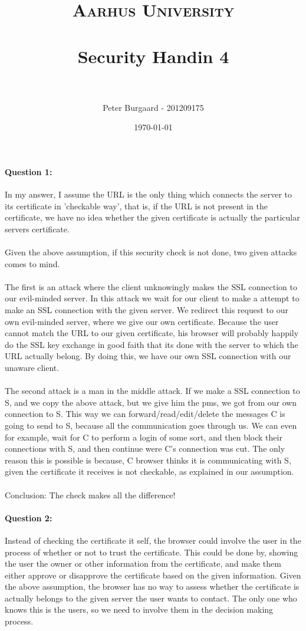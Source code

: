 \documentclass[paper=a4, fontsize=11pt]{scrartcl} %
\title{	
	\normalfont \normalsize 
	\textsc{Aarhus University} \\ [25pt] %
	\horrule{0.5pt} \\[0.4cm] %
	\huge Security Handin 4 \\ %
	\horrule{2pt} \\[0.5cm] %
}
\author{Peter Burgaard - 201209175} %
\date{\normalsize\today} %
\numberwithin{equation}{section} %
\numberwithin{figure}{section} %
\numberwithin{table}{section} %
\begin{document}
	
	\maketitle %
	
	\paragraph{Question 1:} In my answer, I assume the URL is the only thing which connects the server to its certificate in 'checkable way', that is, if the URL is not present in the certificate, we have no idea whether the given certificate is actually the particular servers certificate.  \\ \\
	Given the above assumption, if this security check is not done, two given attacks comes to mind. \\ \\
	The first is an attack where the client unknowingly makes the SSL connection to our evil-minded server. In this attack we wait for our client to make a attempt to make an SSL connection with the given server. We redirect this request to our own evil-minded server, where we give our own certificate. Because the user cannot match the URL to our given certificate, his browser will probably happily do the SSL key exchange in good faith that its done with the server to which the URL actually belong. By doing this, we have our own SSL connection with our unaware client. \\ \\
	The second attack is a man in the middle attack. If we make a SSL connection to S, and we copy the above attack, but we give him the pms, we got from our own connection to S. This way we can forward/read/edit/delete the messages C is going to send to S, because all the communication goes through us. We can even for example, wait for C to perform a login of some sort, and then block their connections with S, and then continue were C's connection was cut. The only reason this is possible is because, C browser thinks it is communicating with S, given the certificate it receives is not checkable, as explained in our assumption. \\ \\
	Conclusion: The check makes all the difference!
	\paragraph{Question 2:}  Instead of checking the certificate it self, the browser could involve the user in the process of whether or not to trust the certificate. This could be done by, showing the user the owner or other information from the certificate, and make them either approve or disapprove the certificate based on the given information. Given the above assumption, the browser has no way to assess whether the certificate is actually belongs to the given server the user wants to contact. The only one who knows this is the users, so we need to involve them in the decision making process.
\end{document}
